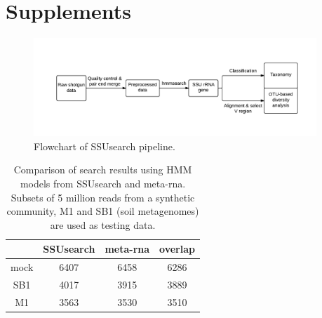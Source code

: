 \documentclass[12pt]{article}
\begin{document}



\section{Supplements}


\begin{figure}[tbph!]
  \centering
  \includegraphics[width=0.95\textwidth]{figs/flowchart}
  \caption[Flowchart of SSUsearch pipeline]{Flowchart of SSUsearch pipeline.}
  \label{fig:flowchart}
\end{figure}


\begin{table}[tbph!]

 \caption{Comparison of search results using HMM models from SSUsearch
 and meta-rna. Subsets of 5 million reads from a synthetic community,
 M1 and SB1 (soil metagenomes) are used as testing data.}

\label{tab:hmm_comparison}
\begin{tabular}{cccc}
\toprule
     & SSUsearch & meta-rna & overlap \\
\midrule
mock & 6407      & 6458     & 6286 \\
SB1  & 4017      & 3915     & 3889 \\
M1   & 3563      & 3530     & 3510 \\
\bottomrule
\end{tabular}
\end{table}
\end{document}
